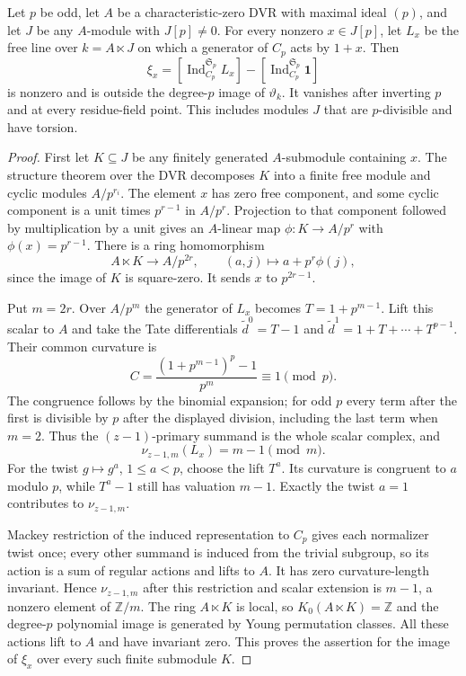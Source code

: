 \begin{proposition}
\label{C:odd_torsion_allheights}
Let $p$ be odd, let $A$ be a characteristic-zero DVR with maximal
ideal $(p)$, and let $J$ be any $A$-module with $J[p]\ne0$.
For every nonzero $x\in J[p]$, let $L_x$ be the free line over
$k=A\ltimes J$ on which a generator of $C_p$ acts by $1+x$.
Then
\[
 \xi_x=[\operatorname{Ind}_{C_p}^{\mathfrak S_p}L_x]
       -[\operatorname{Ind}_{C_p}^{\mathfrak S_p}\mathbf1]
\]
is nonzero and is outside the degree-$p$ image of $\vartheta_k$.
It vanishes after inverting $p$ and at every residue-field point.
This includes modules $J$ that are $p$-divisible and have torsion.
\end{proposition}
\begin{proof}
First let $K\subseteq J$ be any finitely generated $A$-submodule
containing $x$. The structure theorem over the DVR decomposes
$K$ into a finite free module and cyclic modules $A/p^{r_i}$.
The element $x$ has zero free component, and some cyclic
component is a unit times $p^{r-1}$ in $A/p^r$.
Projection to that component followed by multiplication by a unit
gives an $A$-linear map $\phi:K\to A/p^r$ with
$\phi(x)=p^{r-1}$.
There is a ring homomorphism
\[
 A\ltimes K\longrightarrow A/p^{2r},\qquad
       (a,j)\longmapsto a+p^r\phi(j),
\]
since the image of $K$ is square-zero. It sends $x$ to
$p^{2r-1}$.

Put $m=2r$. Over $A/p^m$ the generator of $L_x$ becomes
$T=1+p^{m-1}$. Lift this scalar to $A$ and take the Tate
differentials $\widetilde d^0=T-1$ and
$\widetilde d^1=1+T+\cdots+T^{p-1}$.
Their common curvature is
\[
 C=\frac{(1+p^{m-1})^p-1}{p^m}\equiv1\pmod p.
\]
The congruence follows by the binomial expansion; for odd $p$
every term after the first is divisible by $p$ after the displayed
division, including the last term when $m=2$.
Thus the $(z-1)$-primary summand is the whole scalar complex, and
\[
 \nu_{z-1,m}(L_x)=m-1\pmod m.
\]
For the twist $g\mapsto g^a$, $1\le a<p$, choose the lift $T^a$.
Its curvature is congruent to $a$ modulo $p$, while
$T^a-1$ still has valuation $m-1$. Exactly the twist $a=1$
contributes to $\nu_{z-1,m}$.

Mackey restriction of the induced representation to $C_p$ gives
each normalizer twist once; every other summand is induced from
the trivial subgroup, so its action is a sum of regular actions
and lifts to $A$. It has zero curvature-length invariant.
Hence $\nu_{z-1,m}$ after this restriction and scalar extension
is $m-1$, a nonzero element of $\mathbb Z/m$.
The ring $A\ltimes K$ is local, so $K_0(A\ltimes K)=\mathbb Z$
and the degree-$p$ polynomial image is generated by Young
permutation classes. All these actions lift to $A$ and have
invariant zero. This proves the assertion for the image of $\xi_x$ over
every such finite submodule $K$.


\end{proof}
